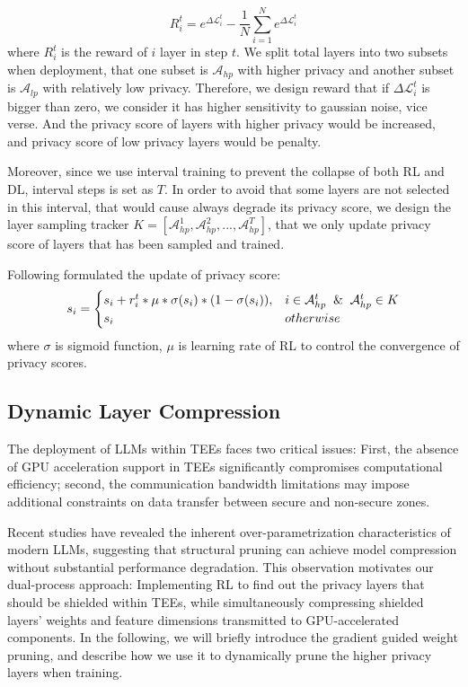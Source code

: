 \documentclass{article}
\begin{document}
\begin{equation}
      R_i^t = e^{\Delta\mathcal{L}_i^t} - \frac{1}{N}\sum^{N}_{i=1}e^{\Delta\mathcal{L}_i^t}
\end{equation}
where $R_i^t$ is the reward of $i$ layer in step $t$. We split total layers into two subsets when deployment, that one subset is $\mathcal{A}_{hp}$ with higher privacy and another subset is $\mathcal{A}_{lp}$ with relatively low privacy. Therefore, we design reward that if $\Delta\mathcal{L}_i^t$ is bigger than zero, we consider it has higher sensitivity to gaussian noise, vice verse. And the privacy score of layers with higher privacy would be increased, and privacy score of low privacy layers would be penalty. 

Moreover, since we use interval training to prevent the collapse of both RL and DL, interval steps is set as $T$. In order to avoid that some layers are not selected in this interval, that would cause always degrade its privacy score, we design the layer sampling tracker $K =[\mathcal{A}_{hp}^1,\mathcal{A}_{hp}^2,...,\mathcal{A}_{hp}^{T}]$, that we only update privacy score of layers that has been sampled and trained.

Following formulated the update of privacy score:
\begin{equation}
    s_i = \begin{cases}
           s_i + r_i^t * \mu * \sigma(s_i)*(1-\sigma(s_i)), & i \in \mathcal{A}_{hp}^t \And \mathcal{A}_{hp}^t\in K \\
           s_i & otherwise
    \end{cases}
\end{equation}
where $\sigma$ is sigmoid function, $\mu$ is learning rate of RL to control the convergence of privacy scores.

\subsection{Dynamic Layer Compression}
The deployment of LLMs within TEEs faces two critical issues: First, the absence of GPU acceleration support in TEEs significantly compromises computational efficiency; second, the communication bandwidth limitations may impose additional constraints on data transfer between secure and non-secure zones.

Recent studies \cite{hoefler2021sparsity_prune,zhang2023loraprune,ma2023llm_prune} have revealed the inherent over-parametrization characteristics of modern LLMs, suggesting that structural pruning can achieve model compression without substantial performance degradation. This observation motivates our dual-process approach: Implementing RL to find out the privacy layers that should be shielded within TEEs, while simultaneously compressing shielded layers' weights and feature dimensions transmitted to GPU-accelerated components.
In the following, we will briefly introduce the gradient guided weight pruning, and describe how we use it to dynamically prune the higher privacy layers when training. 
\end{document}
